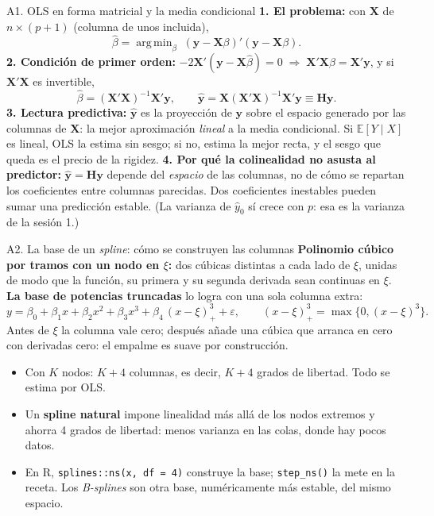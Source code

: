 \documentclass{beamer}
\newcommand{\E}{\mathbb{E}}
\newcommand{\1}{\mathbb{I}}
\DeclareMathOperator*{\argmin}{arg\,min}
\begin{document}
\begin{frame}{A1. OLS en forma matricial y la media condicional}
\small
\textbf{1. El problema:} con $\mathbf{X}$ de $n \times (p+1)$ (columna de unos incluida),
\[ \hat{\beta} = \argmin_{\beta} \; (\mathbf{y} - \mathbf{X}\beta)'(\mathbf{y} - \mathbf{X}\beta). \]
\pause
\textbf{2. Condición de primer orden:} $-2\mathbf{X}'(\mathbf{y} - \mathbf{X}\hat{\beta}) = 0 \;\Rightarrow\; \mathbf{X}'\mathbf{X}\hat{\beta} = \mathbf{X}'\mathbf{y}$, y si $\mathbf{X}'\mathbf{X}$ es invertible,
\[ \hat{\beta} = (\mathbf{X}'\mathbf{X})^{-1}\mathbf{X}'\mathbf{y}, \qquad \hat{\mathbf{y}} = \mathbf{X}(\mathbf{X}'\mathbf{X})^{-1}\mathbf{X}'\mathbf{y} \equiv \mathbf{H}\mathbf{y}. \]
\pause
\textbf{3. Lectura predictiva:} $\hat{\mathbf{y}}$ es la proyección de $\mathbf{y}$ sobre el espacio generado por las columnas de $\mathbf{X}$: la mejor aproximación \emph{lineal} a la media condicional. Si $\E[Y \mid X]$ es lineal, OLS la estima sin sesgo; si no, estima la mejor recta, y el sesgo que queda es el precio de la rigidez.
\pause
\vspace{0.1cm}
\textbf{4. Por qué la colinealidad no asusta al predictor:} $\hat{\mathbf{y}} = \mathbf{H}\mathbf{y}$ depende del \emph{espacio} de las columnas, no de cómo se repartan los coeficientes entre columnas parecidas. Dos coeficientes inestables pueden sumar una predicción estable. (La varianza de $\hat{y}_0$ sí crece con $p$: esa es la varianza de la sesión 1.)
\end{frame}

\begin{frame}{A2. La base de un \emph{spline}: cómo se construyen las columnas}
\small
\textbf{Polinomio cúbico por tramos con un nodo en $\xi$:} dos cúbicas distintas a cada lado de $\xi$, unidas de modo que la función, su primera y su segunda derivada sean continuas en $\xi$.
\pause
\vspace{0.1cm}
\textbf{La base de potencias truncadas} lo logra con una sola columna extra:
\[ y = \beta_0 + \beta_1 x + \beta_2 x^2 + \beta_3 x^3 + \beta_4\,(x - \xi)^3_+ + \varepsilon, \qquad (x-\xi)^3_+ = \max\{0, (x-\xi)^3\}. \]
Antes de $\xi$ la columna vale cero; después añade una cúbica que arranca en cero con derivadas cero: el empalme es suave por construcción.
\pause
\vspace{0.1cm}
\begin{itemize}\itemsep3pt
  \item Con $K$ nodos: $K + 4$ columnas, es decir, $K + 4$ grados de libertad. Todo se estima por OLS.
  \item Un \textbf{spline natural} impone linealidad más allá de los nodos extremos y ahorra 4 grados de libertad: menos varianza en las colas, donde hay pocos datos.
  \item En R, \texttt{splines::ns(x, df = 4)} construye la base; \texttt{step\_ns()} la mete en la receta. Los \emph{B-splines} son otra base, numéricamente más estable, del mismo espacio.
\end{itemize}
\end{frame}
\end{document}
